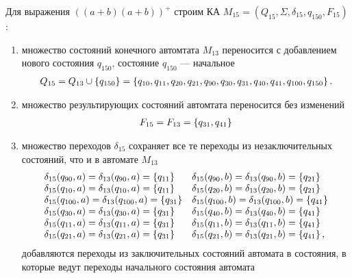 \newpage
Для выражения \(((a+b)(a+b))^+\) строим КА \(M_{15}=(Q_{15}, \Sigma, \delta_{15}, q_{150}, F_{15})\):
\begin{enumerate}
	\item множество состояний конечного автомтата \(M_{13}\) переносится с добавлением нового состояния \(q_{150}\), состояние \(q_{150}\) --- начальное
	      \begin{align*}
		      Q_{15} = Q_{13} \cup \left\{ q_{150}\right\} = \left\{q_{10}, q_{11}, q_{20}, q_{21}, q_{90},q_{30}, q_{31}, q_{40}, q_{41}, q_{100}, q_{150} \right\}.
	      \end{align*}
	\item множество результирующих состояний автомтата переносится без изменений
	      \begin{align*}
		      F_{15} = F_{13} = \left\{q_{31}, q_{41}\right\}
	      \end{align*}
	\item множество переходов  \(\delta_{15}\) сохраняет все те переходы из незаключительных состояний, что и в автомате \(M_{13}\)
	      \begin{align*}
		      \begin{array}{ll}
			      \delta_{15}(q_{90}, a)  = \delta_{13}(q_{90}, a) = \left\{q_{11}\right\} & \delta_{15}(q_{90}, b)  =  \delta_{13}(q_{90}, b) = \left\{q_{21}\right\} \\
			      \delta_{15}(q_{10}, a)  = \delta_{13}(q_{10}, a) = \left\{q_{11}\right\} & \delta_{15}(q_{20}, b)  = \delta_{13}(q_{20}, b) = \left\{q_{21}\right\}  \\
			      \delta_{15}(q_{100}, a)= \delta_{13}(q_{100}, a) = \left\{q_{31}\right\} & \delta_{15}(q_{100}, b) =\delta_{13}(q_{100}, b) = \left\{q_{41}\right\}  \\
			      \delta_{15}(q_{30}, a) = \delta_{13}(q_{30}, a) = \left\{q_{31}\right\}  & \delta_{15}(q_{40}, b)  =\delta_{13}(q_{40}, b) = \left\{q_{41}\right\}   \\
			      \delta_{15}(q_{11}, a) =\delta_{13}(q_{11}, a)  =  \left\{q_{31}\right\} & \delta_{15}(q_{11}, b)=\delta_{13}(q_{11}, b)  =  \left\{q_{41}\right\}   \\
			      \delta_{15}(q_{21}, a) =\delta_{13}(q_{21}, a)  =  \left\{q_{31}\right\} & \delta_{15}(q_{21}, b)=\delta_{13}(q_{21}, b)  =  \left\{q_{41}\right\},
		      \end{array}
	      \end{align*}
	      добавляются переходы из заключительных состояний автомата в состояния, в которые ведут переходы начального состояния автомата
	      \begin{align*}
		      \begin{array}{ll}

\end{array}
\end{align*}
\end{enumerate}
